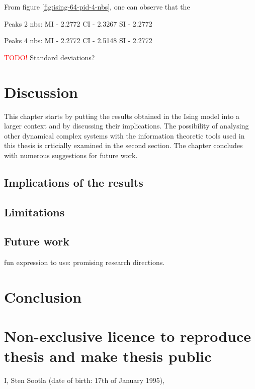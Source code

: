 \documentclass[12pt]{article}
\begin{document}
From figure \ref{fig:ising-64-pid-4-nbs}, one can observe that the 

Peaks 2 nbs:
MI - 2.2772
CI - 2.3267
SI - 2.2772

Peaks 4 nbs:
MI - 2.2772
CI - 2.5148
SI - 2.2772


\textcolor{red}{TODO!} Standard deviations?

\newpage
\section{Discussion}

This chapter starts by putting the results obtained in the Ising model into a larger context and by discussing their implications.  The possibility of analysing other dynamical complex systems with the information theoretic tools used in this thesis is crticially examined in the second section. The chapter concludes with numerous suggestions for future work. 

\subsection{Implications of the results}



\subsection{Limitations}
\subsection{Future work}

fun expression to use: promising research directions.

\newpage
\section*{Conclusion}


\newpage




\appendix
\pagebreak
\section*{\small Non-exclusive licence to reproduce thesis and make thesis public}


I, Sten Sootla (date of birth: 17th of January 1995),
\end{document}
